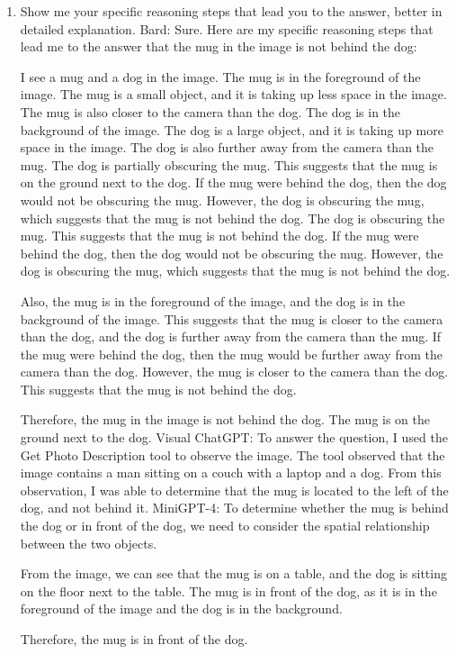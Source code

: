 \begin{enumerate}
    Therefore, the mug in the image is not behind the dog. The mug is on the ground next to the dog.
    \subitem Visual ChatGPT: The mug is located to the left of the dog, not behind it.
    \subitem MiniGPT-4: No, the mug is not behind the dog. It is in front of the dog, on a table in front of the dog.
    \item Show me your specific reasoning steps that lead you to the answer, better in detailed explanation.
    \subitem Bard: 
    Sure. Here are my specific reasoning steps that lead me to the answer that the mug in the image is not behind the dog:
    
    I see a mug and a dog in the image.
    The mug is in the foreground of the image. The mug is a small object, and it is taking up less space in the image. The mug is also closer to the camera than the dog.
    The dog is in the background of the image. The dog is a large object, and it is taking up more space in the image. The dog is also further away from the camera than the mug.
    The dog is partially obscuring the mug. This suggests that the mug is on the ground next to the dog.
    If the mug were behind the dog, then the dog would not be obscuring the mug. However, the dog is obscuring the mug, which suggests that the mug is not behind the dog.
    The dog is obscuring the mug. This suggests that the mug is not behind the dog. If the mug were behind the dog, then the dog would not be obscuring the mug. However, the dog is obscuring the mug, which suggests that the mug is not behind the dog.
    
    Also, the mug is in the foreground of the image, and the dog is in the background of the image. This suggests that the mug is closer to the camera than the dog, and the dog is further away from the camera than the mug. If the mug were behind the dog, then the mug would be further away from the camera than the dog. However, the mug is closer to the camera than the dog. This suggests that the mug is not behind the dog.
    
    Therefore, the mug in the image is not behind the dog. The mug is on the ground next to the dog.
    \subitem Visual ChatGPT: To answer the question, I used the Get Photo Description tool to observe the image. The tool observed that the image contains a man sitting on a couch with a laptop and a dog. From this observation, I was able to determine that the mug is located to the left of the dog, and not behind it.
    \subitem MiniGPT-4: To determine whether the mug is behind the dog or in front of the dog, we need to consider the spatial relationship between the two objects.

    From the image, we can see that the mug is on a table, and the dog is sitting on the floor next to the table. The mug is in front of the dog, as it is in the foreground of the image and the dog is in the background.
    
    Therefore, the mug is in front of the dog.
\end{enumerate}
